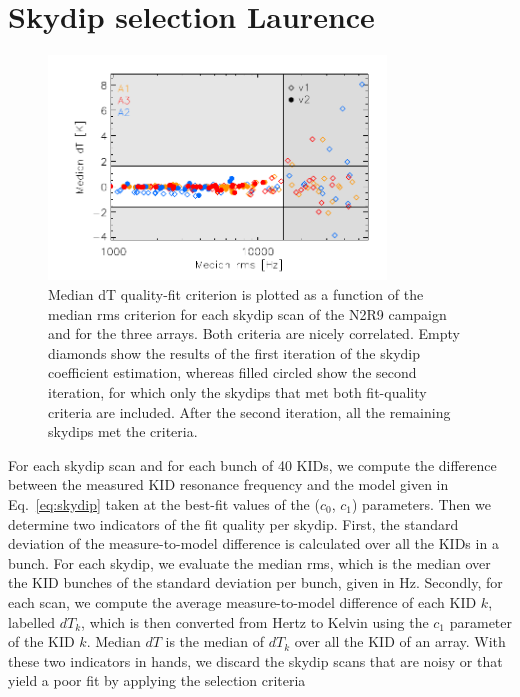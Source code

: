 \section{Skydip selection {\color{YellowGreen} Laurence}}
\label{se:skydip-selection}

\begin{figure}[ht!]
\begin{center}
\includegraphics[clip=true,width=0.8\textwidth]{Figures/Opacity/plot_skydip_selection_two_crit.pdf}
\caption[N2R9 skydip scan selection.]{ Median dT quality-fit criterion is plotted as a function of the median rms criterion for each skydip scan of the N2R9 campaign and for the three arrays. Both criteria are nicely correlated. Empty diamonds show the results of the first iteration of the skydip coefficient estimation, whereas filled circled show the second iteration, for which only the skydips that met both fit-quality criteria are included. After the second iteration, all the remaining skydips met the criteria.}
\label{fig:skydipselection}
\end{center}
\end{figure}

For each skydip scan and for each bunch of 40 KIDs, we compute the
difference between the measured KID resonance frequency and the model
given in Eq.~\ref{eq:skydip} taken at the best-fit values of the
($c_0$, $c_1$) parameters. Then we determine two indicators of the fit
quality per skydip. First, the standard deviation of the
measure-to-model difference is calculated over all the KIDs in a
bunch. For each skydip, we evaluate the median rms, which is the
median over the KID bunches of the standard deviation per bunch, given
in Hz. Secondly, for each scan, we compute the average
measure-to-model difference of each KID $k$, labelled $dT_k$, which is
then converted from Hertz to Kelvin using the $c_1$ parameter of the
KID $k$. Median $dT$ is the median of $dT_k$ over all the KID of an
array. With these two indicators in hands, we discard the skydip scans
that are noisy or that yield a poor fit by applying the selection
criteria

